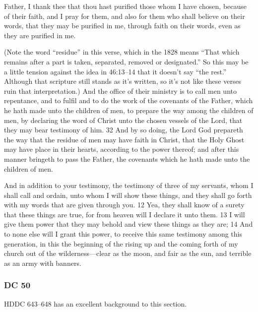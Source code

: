 \begin{compactdesc}
\begin{compactdesc}
\begin{compactdesc}
			\item[3N 19:28] Father, I thank thee that thou hast purified those whom I have chosen, because of their faith, and I pray for them, and also for them who shall believe on their words, that they may be purified in me, through faith on their words, even as they are purified in me.
			\item[Mor 7:31--32] (Note the word ``residue'' in this verse, which in the 1828 means ``That which remains after a part is taken, separated, removed or designated.'' So this may be a little tension against the idea in 46:13--14 that it doesn't say ``the rest.'' Although that scripture still stands as it's written, so it's not like these verses ruin that interpretation.) And the office of their ministry is to call men unto repentance, and to fulfil and to do the work of the covenants of the Father, which he hath made unto the children of men, to prepare the way among the children of men, by declaring the word of Christ unto the chosen vessels of the Lord, that they may bear testimony of him. 32 And by so doing, the Lord God prepareth the way that the residue of men may have faith in Christ, that the Holy Ghost may have place in their hearts, according to the power thereof; and after this manner bringeth to pass the Father, the covenants which he hath made unto the children of men.
			\item[DC 5:11--14] And in addition to your testimony, the testimony of three of my servants, whom I shall call and ordain, unto whom I will show these things, and they shall go forth with my words that are given through you. 12 Yea, they shall know of a surety that these things are true, for from heaven will I declare it unto them. 13 I will give them power that they may behold and view these things as they are; 14 And to none else will I grant this power, to receive this same testimony among this generation, in this the beginning of the rising up and the coming forth of my church out of the wilderness---clear as the moon, and fair as the sun, and terrible as an army with banners.
			\end{compactdesc}
		\end{compactdesc}
		
		\end{compactdesc}
		
	\subsubsection{DC 50} %
	
		HDDC 643--648 has an excellent background to this section.
	
